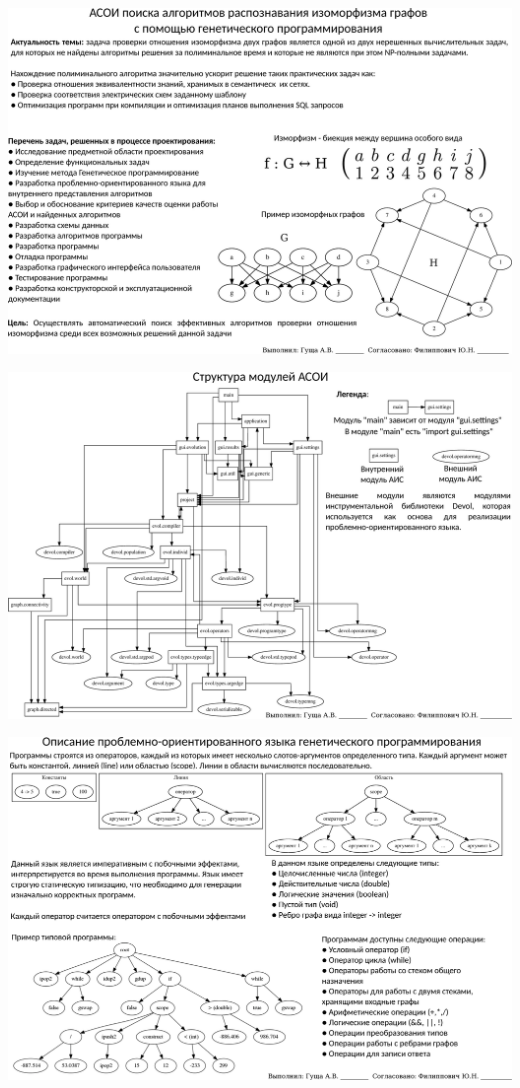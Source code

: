 \documentclass[russian,utf8, a1paper, emptystyle]{eskdgraph}
\begin{document}
\begin{ESKDdrawing}

\includegraphics[scale=0.99]{list1}

\end{ESKDdrawing}

\begin{ESKDdrawing}
\includegraphics[scale=0.98]{list2}
\end{ESKDdrawing}

\begin{ESKDdrawing}
\includegraphics[scale=0.98]{list3}
\end{ESKDdrawing}
\end{document}
